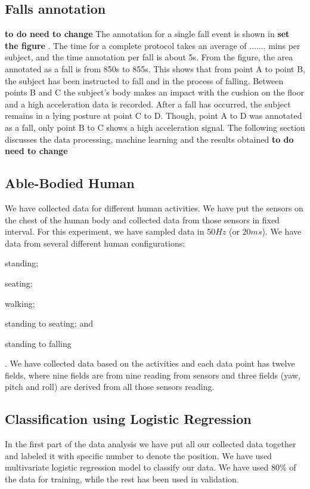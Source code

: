 \documentclass[letterpaper]{article}
\begin{document}
\subsection{Falls annotation}
\textbf{to do need to change}
The annotation for a single fall event is shown in \textbf{{set the figure} }. The time for a 
complete protocol takes an average of ....... mins
per subject, and the time annotation per fall is about 5s. From
the figure, the area annotated as a fall is from 850s to 855s.
This shows that from point A to point B, the subject has been
instructed to fall and in the process of falling. Between points
B and C the subject’s body makes an impact with the cushion
on the floor and a high acceleration data is recorded. After a
fall has occurred, the subject remains in a lying posture at point
C to D. Though, point A to D was annotated as a fall, only
point B to C shows a high acceleration signal. The following
section discusses the data processing, machine learning and
the results obtained
\textbf{to do need to change}

\subsection{Able-Bodied Human} \label{ableBodiedHuman}

We have collected data for different human activities. We have put the sensors on the chest of the
human body and collected data from those sensors in fixed interval. For this experiment, we have
sampled data in 50$Hz$ (or 20$ms$). We have data from several different human configurations:
\begin{inparaenum}[(1)] \item standing; \item seating; \item walking; \item standing to seating;
and \item standing to falling\end{inparaenum}. We have collected data based on the activities and
each data point has twelve fields, where nine fields are from nine reading from sensors and three
fields (yaw, pitch and roll) are derived from all those sensors reading.

\subsection{Classification using Logistic Regression}

In the first part of the data analysis we have put all our collected data together and labeled it
with specific number to denote the position. We have used multivariate logistic regression model to
classify our data. We have used 80\% of the data for training, while the rest has been used
in validation.
\end{document}
